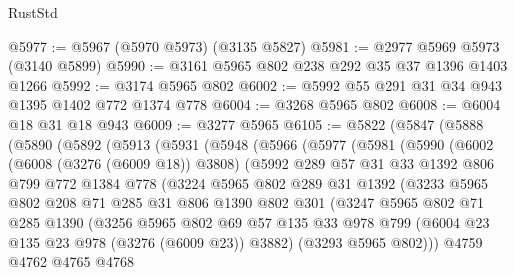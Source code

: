 \begin{lexlean}{RustStd}
\begin{coremodule}
{\begin{coremodule}
{{{{{{{{{{{{{{{@5977 := @5967 (@5970 @5973) (@3135 @5827)
@5981 := @2977 @5969 @5973 (@3140 @5899)
@5990 := @3161 @5965 @802 @238 @292 @35 @37 @1396 @1403 @1266
@5992 := @3174 @5965 @802
@6002 := @5992 @55 @291 @31 @34 @943 @1395 @1402 @772 @1374 @778
@6004 := @3268 @5965 @802
@6008 := @6004 @18 @31 @18 @943
@6009 := @3277 @5965
@6105 := @5822
    (@5847
      (@5888
        (@5890
          (@5892
            (@5913
              (@5931
                (@5948
                  (@5966
                    (@5977
                      (@5981
                        (@5990
                          (@6002
                            (@6008 (@3276 (@6009 @18)) @3808)
                            (@5992
                              @289
                              @57
                              @31
                              @33
                              @1392
                              @806
                              @799
                              @772
                              @1384
                              @778
                              (@3224
                                @5965
                                @802
                                @289
                                @31
                                @1392
                                (@3233
                                  @5965
                                  @802
                                  @208
                                  @71
                                  @285
                                  @31
                                  @806
                                  @1390
                                  @802
                                  @301
                                  (@3247
                                    @5965
                                    @802
                                    @71
                                    @285
                                    @1390
                                    (@3256
                                      @5965
                                      @802
                                      @69
                                      @57
                                      @135
                                      @33
                                      @978
                                      @799
                                      (@6004 @23 @135 @23 @978 (@3276 (@6009 @23)) @3882)
                                      (@3293 @5965 @802)))
                                  @4759
                                  @4762
                                  @4765
                                  @4768
}}}}}}}}}}}}}}}
\end{coremodule}}
\end{coremodule}
\end{lexlean}
